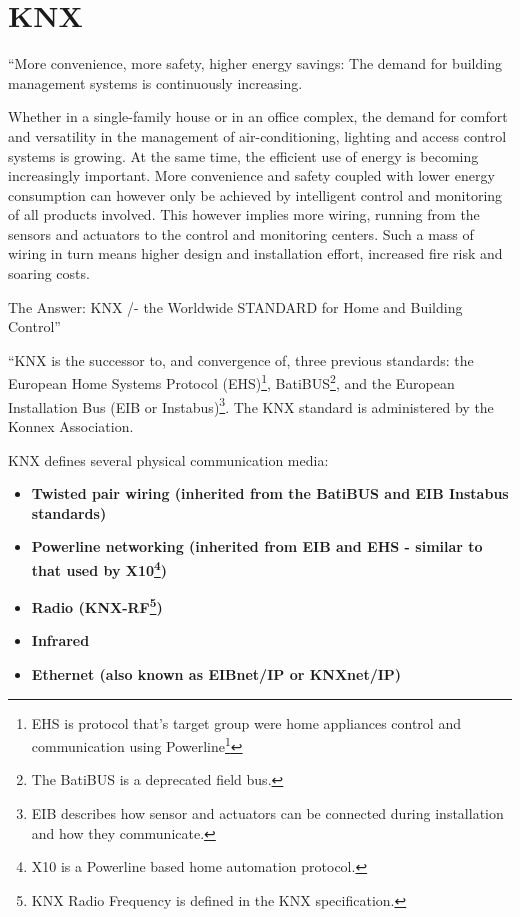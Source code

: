 \section{KNX}
``More convenience, more safety, higher energy savings: The demand for building management systems is continuously increasing.

Whether in a single-family house or in an office complex, the demand for comfort and versatility in the management of air-conditioning, lighting and access control systems is growing. At the same time, the efficient use of energy is becoming increasingly important. More convenience and safety coupled with lower energy consumption can however only be achieved by intelligent control and monitoring of all products involved. This however implies more wiring, running from the sensors and actuators to the control and monitoring centers. Such a mass of wiring in turn means higher design and installation effort, increased fire risk and soaring costs.

The Answer: KNX /- the Worldwide STANDARD for Home and Building Control''\cite{knx.org}

``KNX is the successor to, and convergence of, three previous standards: the European Home Systems Protocol  (EHS)\footnote[1]{EHS is protocol that's target group were home appliances control and communication using Powerline\footnote[2]{Communication over wires carrying electrical power is called Powerline.}}, BatiBUS\footnote[3]{The BatiBUS is a deprecated field bus.}, and the European Installation Bus (EIB or Instabus)\footnote[4]{EIB describes how sensor and actuators can be connected during installation and how they communicate.}. The KNX standard is administered by the Konnex Association.

KNX defines several physical communication media:

\begin{itemize}
    \item \textbf{Twisted pair wiring (inherited from the BatiBUS and EIB Instabus standards)}
    \item \textbf{Powerline networking (inherited from EIB and EHS - similar to that used by X10\footnote[5]{X10 is a Powerline based home automation protocol.})}
    \item \textbf{Radio (KNX-RF\footnote[6]{KNX Radio Frequency is defined in the KNX specification.})}
    \item \textbf{Infrared}
    \item \textbf{Ethernet (also known as EIBnet/IP or KNXnet/IP)}
\end{itemize}


